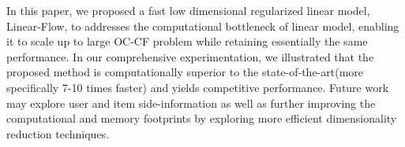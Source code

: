 
In this paper, we proposed a fast low dimensional regularized linear model, Linear-Flow, to addresses the computational bottleneck of linear model, enabling it to scale up to large OC-CF problem while retaining essentially the same performance. In our comprehensive experimentation, we illustrated that the proposed method is computationally superior to the state-of-the-art(more specifically 7-10 times faster) and yields competitive performance. Future work may explore user and item side-information as well as further improving the computational and memory footprints by exploring more efficient dimensionality reduction techniques.